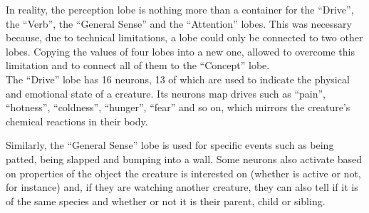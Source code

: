 \documentclass[11pt,twoside,a4paper]{article}
\begin{document}
In reality, the perception lobe is nothing more than a container for the “Drive”, the “Verb”, the “General Sense” and the “Attention” lobes. This was necessary because, due to technical limitations, a lobe could only be connected to two other lobes. Copying the values of four lobes into a new one, allowed to overcome this limitation and to connect all of them to the “Concept” lobe.~\\

The “Drive” lobe has 16 neurons, 13 of which are used to indicate the physical and emotional state of a creature. Its neurons map drives such as “pain”, “hotness”, “coldness”, “hunger”, “fear” and so on, which mirrors the creature’s chemical reactions in their body.~\\


Similarly, the “General Sense” lobe is used for specific events such as being patted, being slapped and bumping into a wall. Some neurons also activate based on properties of the object the creature is interested on (whether is active or not, for instance) and, if they are watching another creature, they can also tell if it is of the same species and whether or not it is their parent, child or sibling.~\\
\end{document}
